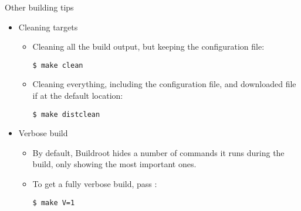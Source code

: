 \begin{frame}[fragile]{Other building tips}
  \begin{itemize}
  \item Cleaning targets
    \begin{itemize}
    \item Cleaning all the build output, but keeping the configuration
      file:
      \begin{block}{}
\begin{verbatim}
$ make clean
\end{verbatim}
      \end{block}
    \item Cleaning everything, including the configuration file, and
      downloaded file if at the default location:
      \begin{block}{}
\begin{verbatim}
$ make distclean
\end{verbatim}
      \end{block}
    \end{itemize}
  \item Verbose build
    \begin{itemize}
    \item By default, Buildroot hides a number of commands it runs
      during the build, only showing the most important ones.
    \item To get a fully verbose build, pass :
      \begin{block}{}
\begin{verbatim}
$ make V=1
\end{verbatim}
      \end{block}
    \end{itemize}
  \end{itemize}
\end{frame}
